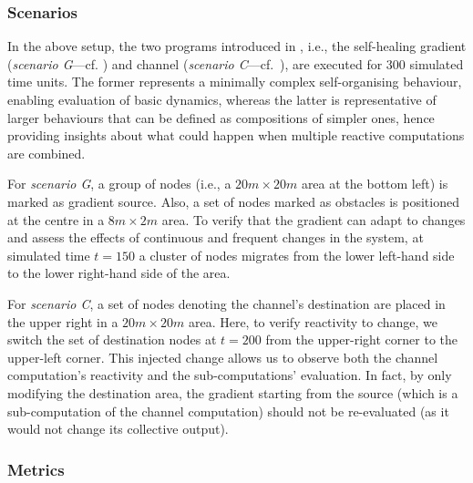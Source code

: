 \subsubsection{Scenarios}

In the above setup, the two programs introduced in ,
 i.e., the self-healing gradient (\emph{scenario G}---cf. ) and channel (\emph{scenario C}---cf.~),
 are executed for 300 simulated time units. 
%
The former represents a minimally complex self-organising behaviour, enabling evaluation of basic dynamics, 
 whereas the latter is representative of larger behaviours that can be defined as compositions of simpler ones, hence 
 providing insights about what could happen when multiple reactive computations are combined.

For \emph{scenario G},
 a group of nodes (i.e., a $20m \times 20m$ area at the bottom left) is marked as gradient source.
%
Also, a set of nodes marked as obstacles is positioned at the centre in a $8m \times 2m$ area.
%
To verify that the gradient can adapt to changes and assess the effects of continuous and frequent changes in the system,
at simulated time $t=150$ a cluster of nodes migrates from the lower left-hand side to the lower right-hand side of the area.

For \emph{scenario C},
 a set of nodes denoting the channel's destination are placed in the upper right in a $20m \times 20m$ area.
 Here, to verify reactivity to change, 
 we switch the set of destination nodes at $t=200$ 
 from the upper-right corner to the upper-left corner. 
This injected change allows us to observe both
 the channel computation's reactivity and the sub-computations' evaluation.
 In fact, by only modifying the destination area, the gradient starting from the source (which is a sub-computation of the channel computation) should not be re-evaluated (as it would not change its collective output).

\subsubsection{Metrics}

